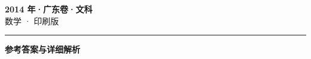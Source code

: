 \documentclass[zihao=5, a4paper]{ctexart}
\begin{document}
\begin{center}
  {\Large\bfseries 2014 年·广东卷·文科}\\[4pt]
  {\large 数学 · 印刷版}
\end{center}
\medskip
{}

\par\bigskip\hrule\bigskip
{}
\Needspace{0.55\textheight}
\begin{center}{\large\bfseries 参考答案与详细解析}\end{center}
\smallskip

\end{document}
